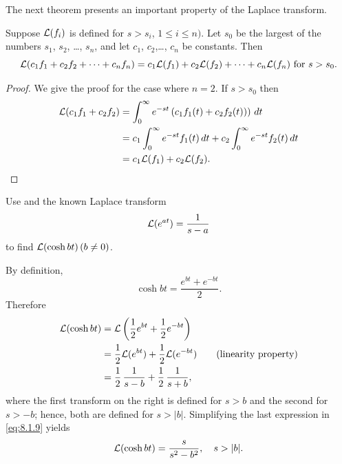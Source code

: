 The next theorem presents an important property of the Laplace
transform.

\begin{theorem}\label{thmtype:8.1.2}
 Suppose ${\mathcal L}(f_i)$ is defined for
 $s>s_i$, $1\le i\le n)$.
Let $s_0$ be the largest of the numbers $s_1$, $s_{2}$, \dots, $s_n$, and
let
$c_1$, $c_2$,\dots, $c_n$ be  constants. Then
\[
{\mathcal L}(c_1f_1+c_2f_2+\cdots+c_nf_n)=c_1{\mathcal L}(f_1)+c_2{\mathcal L}(f_2)
+\cdots+c_n{\mathcal L}(f_n)\text{ for } s>s_0.
\]
\end{theorem}

\begin{proof}
We give the proof for the case where $n=2$. If $s>s_0$ then
\begin{align*}
{\mathcal L}(c_1f_1+c_2f_2)
&=\int_0^\infty e^{-st}\left(c_1f_1(t)+c_2f_2(t))\right)\,dt\\
&=c_1\int_0^\infty e^{-st}f_1(t)\,dt+c_2\int_0^\infty e^{-st}f_2(t)\,dt\\
&=c_1{\mathcal L}(f_1)+c_2{\mathcal L}(f_2).
\end{align*}
\end{proof}

\begin{example}\label{example:8.1.6}
Use   and the known Laplace transform
\[
{\mathcal L}(e^{at})=\frac{1}{s-a}
\]
 to find ${\mathcal L}(\cosh bt)\,(b\ne0)$.
\end{example}

\begin{solution}
By definition,
\[
\cosh bt=\frac{e^{bt}+e^{-bt}}{2}.
\]
Therefore
\begin{equation}\label{eq:8.1.9}
\begin{aligned}
{\mathcal L}(\cosh bt)
&={\mathcal L}\left(\frac{1}{2} e^{bt}+\frac{1}{2}e^{-bt}\right)\\
&=\frac{1}{2} {\mathcal L}(e^{bt}) +\frac{1}{2} {\mathcal L}(e^{-bt})
\qquad\hbox{(linearity property)}\\
&=\frac{1}{2}\,\frac{1}{s-b} +\frac{1}{2}\,\frac{1}{s+b},
\end{aligned}
\end{equation}
where the first transform on the right is defined for $s>b$ and the
second
for $s>-b$; hence, both are defined for $s>|b|$.  Simplifying the
last expression in \eqref{eq:8.1.9} yields
\[
{\mathcal L}(\cosh bt)=\frac{s}{s^2-b^2},\quad s>|b|.\qedhere
\]
\end{solution}



